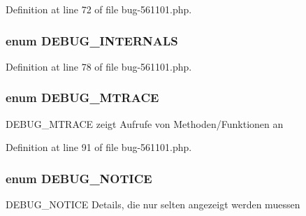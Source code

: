 \-Definition at line 72 of file bug-\/561101.\-php.

\hypertarget{bug-561101_8php_a6a8e059050dc3e86113330a22a102bf4}{
\subsubsection[{\-D\-E\-B\-U\-G\-\_\-\-I\-N\-T\-E\-R\-N\-A\-L\-S}]{\setlength{\rightskip}{0pt plus 5cm}enum {\bf \-D\-E\-B\-U\-G\-\_\-\-I\-N\-T\-E\-R\-N\-A\-L\-S}}}\label{bug-561101_8php_a6a8e059050dc3e86113330a22a102bf4}


\-Definition at line 78 of file bug-\/561101.\-php.

\hypertarget{bug-561101_8php_af4088d2f82c5bcdd0689ecf59a0a920f}{
\subsubsection[{\-D\-E\-B\-U\-G\-\_\-\-M\-T\-R\-A\-C\-E}]{\setlength{\rightskip}{0pt plus 5cm}enum {\bf \-D\-E\-B\-U\-G\-\_\-\-M\-T\-R\-A\-C\-E}}}\label{bug-561101_8php_af4088d2f82c5bcdd0689ecf59a0a920f}
\-D\-E\-B\-U\-G\-\_\-\-M\-T\-R\-A\-C\-E zeigt \-Aufrufe von \-Methoden/\-Funktionen an 

\-Definition at line 91 of file bug-\/561101.\-php.

\hypertarget{bug-561101_8php_af2b6749ec55a9dcd7880eea2bf0ac32c}{
\subsubsection[{\-D\-E\-B\-U\-G\-\_\-\-N\-O\-T\-I\-C\-E}]{\setlength{\rightskip}{0pt plus 5cm}enum {\bf \-D\-E\-B\-U\-G\-\_\-\-N\-O\-T\-I\-C\-E}}}\label{bug-561101_8php_af2b6749ec55a9dcd7880eea2bf0ac32c}
\-D\-E\-B\-U\-G\-\_\-\-N\-O\-T\-I\-C\-E \-Details, die nur selten angezeigt werden muessen 

